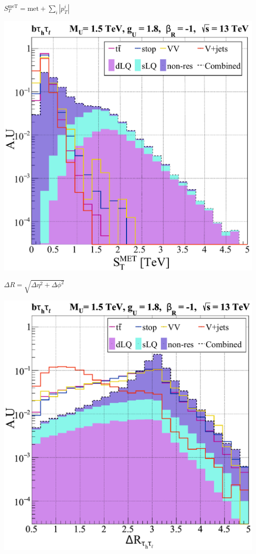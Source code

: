 \documentclass{bredelebeamer}
\begin{document}
\begin{frame}{$S_T^{\text{meT}}=\text{met} + \sum_i\left|p_{T}^i\right|$}
	\begin{center}
		\includegraphics[width=.65\linewidth]{sTTeV_semileptonic_sLQ_wRHC.pdf}
	\end{center}
	
\end{frame}

\begin{frame}{$\Delta R = \sqrt{\Delta \eta^2 + \Delta \phi^2}$}
	\begin{center}
		\includegraphics[width=.65\linewidth]{DeltaR_semileptonic_sLQ_wRHC.pdf}	
	\end{center}
	
\end{frame}
\end{document}
